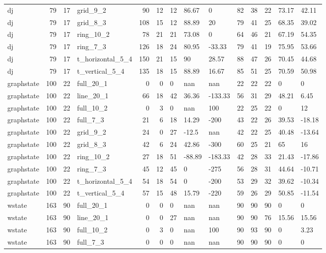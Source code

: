 \begin{longtable}{lrrlrrlllrrlll}
dj & 79 & 17 & grid\_9\_2 & 90 & 12 & 12 & 86.67 & 0 & 82 & 38 & 22 & 73.17 & 42.11 \\
dj & 79 & 17 & grid\_8\_3 & 108 & 15 & 12 & 88.89 & 20 & 79 & 41 & 25 & 68.35 & 39.02 \\
dj & 79 & 17 & ring\_10\_2 & 78 & 21 & 21 & 73.08 & 0 & 64 & 46 & 21 & 67.19 & 54.35 \\
dj & 79 & 17 & ring\_7\_3 & 126 & 18 & 24 & 80.95 & -33.33 & 79 & 41 & 19 & 75.95 & 53.66 \\
dj & 79 & 17 & t\_horizontal\_5\_4 & 150 & 21 & 15 & 90 & 28.57 & 88 & 47 & 26 & 70.45 & 44.68 \\
dj & 79 & 17 & t\_vertical\_5\_4 & 135 & 18 & 15 & 88.89 & 16.67 & 85 & 51 & 25 & 70.59 & 50.98 \\
graphstate & 100 & 22 & full\_20\_1 & 0 & 0 & 0 & nan & nan & 22 & 22 & 22 & 0 & 0 \\
graphstate & 100 & 22 & line\_20\_1 & 66 & 18 & 42 & 36.36 & -133.33 & 56 & 31 & 29 & 48.21 & 6.45 \\
graphstate & 100 & 22 & full\_10\_2 & 0 & 3 & 0 & nan & 100 & 22 & 25 & 22 & 0 & 12 \\
graphstate & 100 & 22 & full\_7\_3 & 21 & 6 & 18 & 14.29 & -200 & 43 & 22 & 26 & 39.53 & -18.18 \\
graphstate & 100 & 22 & grid\_9\_2 & 24 & 0 & 27 & -12.5 & nan & 42 & 22 & 25 & 40.48 & -13.64 \\
graphstate & 100 & 22 & grid\_8\_3 & 42 & 6 & 24 & 42.86 & -300 & 60 & 25 & 21 & 65 & 16 \\
graphstate & 100 & 22 & ring\_10\_2 & 27 & 18 & 51 & -88.89 & -183.33 & 42 & 28 & 33 & 21.43 & -17.86 \\
graphstate & 100 & 22 & ring\_7\_3 & 45 & 12 & 45 & 0 & -275 & 56 & 28 & 31 & 44.64 & -10.71 \\
graphstate & 100 & 22 & t\_horizontal\_5\_4 & 54 & 18 & 54 & 0 & -200 & 53 & 29 & 32 & 39.62 & -10.34 \\
graphstate & 100 & 22 & t\_vertical\_5\_4 & 57 & 15 & 48 & 15.79 & -220 & 59 & 26 & 29 & 50.85 & -11.54 \\
wstate & 163 & 90 & full\_20\_1 & 0 & 0 & 0 & nan & nan & 90 & 90 & 90 & 0 & 0 \\
wstate & 163 & 90 & line\_20\_1 & 0 & 0 & 27 & nan & nan & 90 & 90 & 76 & 15.56 & 15.56 \\
wstate & 163 & 90 & full\_10\_2 & 0 & 3 & 0 & nan & 100 & 90 & 93 & 90 & 0 & 3.23 \\
wstate & 163 & 90 & full\_7\_3 & 0 & 0 & 0 & nan & nan & 90 & 90 & 90 & 0 & 0 \\

\end{longtable}
